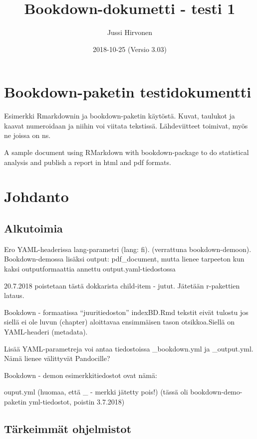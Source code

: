 \documentclass[finnish,]{book}
\title{Bookdown-dokumetti - testi 1}
\author{Jussi Hirvonen}
\date{2018-10-25 (Versio 3.03)}
\theoremstyle{definition}
\theoremstyle{definition}
\theoremstyle{definition}
\theoremstyle{remark}
\begin{document}
\maketitle

{
\setcounter{tocdepth}{1}
\tableofcontents
}
\hypertarget{bookdown-paketin-testidokumentti}{%
\chapter{Bookdown-paketin
testidokumentti}\label{bookdown-paketin-testidokumentti}}

Esimerkki Rmarkdownin ja bookdown-paketin käytöstä. Kuvat, taulukot ja
kaavat numeroidaan ja niihin voi viitata tekstissä. Lähdeviitteet
toimivat, myös ne joissa on ns.

A sample document using RMarkdown with bookdown-package to do
statistical analysis and publish a report in html and pdf formats.

\hypertarget{johdanto}{%
\chapter{Johdanto}\label{johdanto}}

\hypertarget{alkutoimia}{%
\section{Alkutoimia}\label{alkutoimia}}

Ero YAML-headerissa lang-parametri (lang: fi). (verrattuna
bookdown-demoon). Bookdown-demossa lisäksi output: pdf\_document, mutta
lienee tarpeeton kun kaksi outputformaattia annettu
output.yaml-tiedostossa

20.7.2018 poistetaan tästä dokkarista child-item - jutut. Jätetään
r-pakettien lataus.

Bookdown - formaatissa ``juuritiedoston'' indexBD.Rmd tekstit eivät
tulostu jos siellä ei ole luvun (chapter) aloittavaa ensimmäisen tason
otsikkoa.Siellä on YAML-headeri (metadata).

Lisää YAML-parametreja voi antaa tiedostoissa \_bookdown.yml ja
\_output.yml. Nämä lienee välittyvät Pandocille?

Bookdown - demon esimerkkitiedostot ovat nämä:

ouput.yml (huomaa, että \_ - merkki jätetty pois!) (tässä oli
bookdown-demo-paketin yml-tiedostot, poistin 3.7.2018)

\hypertarget{tarkeimmat-ohjelmistot}{%
\section{Tärkeimmät ohjelmistot}\label{tarkeimmat-ohjelmistot}}
\end{document}
